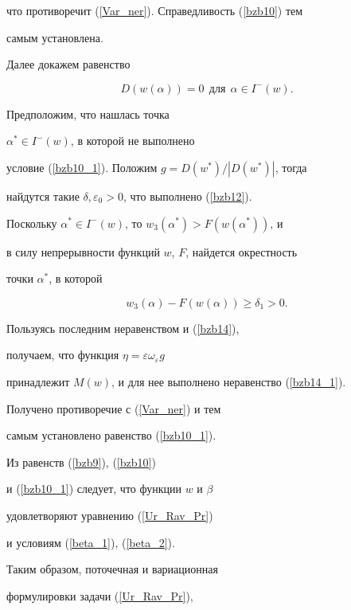 что противоречит (\ref{Var_ner}). Справедливость (\ref{bzb10}) тем


самым установлена.





Далее докажем равенство


\begin{equation} 


D(w(\alpha ))=0 \ \ \text{для}\ \ \alpha \in I^{-}(w) . 


\label{bzb10_1}


\end{equation}


Предположим, что нашлась точка


$\alpha^* \in I^{-}(w) $, в которой не выполнено 


условие (\ref{bzb10_1}). Положим $ g=D(w^*) / |D(w^*)|$, тогда 


найдутся такие $\delta, \varepsilon_0 > 0$, что выполнено (\ref{bzb12}).


Поскольку $\alpha^* \in I^{-}(w)$, то $w_3(\alpha^* )>F(w(\alpha^* )) $, и


в силу непрерывности функций $w$, $F$, найдется окрестность 


точки $\alpha^*$, в которой


$$


w_3 (\alpha ) - F(w (\alpha )) \geq \delta_1> 0.


$$


Пользуясь последним неравенством и (\ref{bzb14}),


получаем, что функция $\eta=\varepsilon \omega _{\varepsilon}g$


принадлежит $M(w)$, и для нее выполнено неравенство (\ref{bzb14_1}).


Получено противоречие с (\ref{Var_ner}) и тем


самым установлено равенство (\ref{bzb10_1}).





Из равенств (\ref{bzb9}), (\ref{bzb10})


и (\ref{bzb10_1}) следует, что функции $w$ и $\beta$


удовлетворяют уравнению (\ref{Ur_Rav_Pr})


и условиям (\ref{beta_1}), (\ref{beta_2}).


Таким образом, поточечная и вариационная


формулировки задачи (\ref{Ur_Rav_Pr}),



